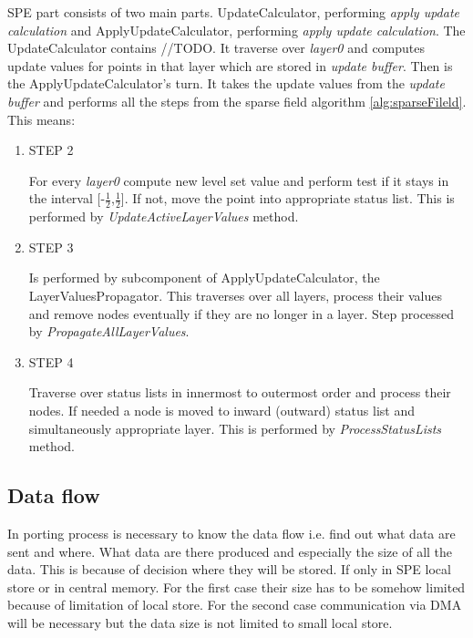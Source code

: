 SPE part consists of two main parts.
UpdateCalculator, performing \emph{apply update calculation} and ApplyUpdateCalculator, performing \emph{apply update calculation}.
The UpdateCalculator contains //TODO. It traverse over \emph{layer0} and computes update values for points in that layer which are stored in \emph{update buffer}.
Then is the ApplyUpdateCalculator's turn.
It takes the update values from the \emph{update buffer} and performs all the steps from the sparse field algorithm \ref{alg:sparseFileld}.
This means:
\begin{enumerate}
\item STEP 2
\par
For every \emph{layer0} compute new level set value and perform test if it stays in the interval [-$\frac{1}{2}$,$\frac{1}{2}$].
If not, move the point into appropriate status list.
This is performed by \emph{UpdateActiveLayerValues} method.

\item STEP 3
\par
Is performed by subcomponent of ApplyUpdateCalculator, the LayerValuesPropagator.
This traverses over all layers, process their values and remove nodes eventually if they are no longer in a layer.
Step processed by \emph{PropagateAllLayerValues}.

\item STEP 4
\par
Traverse over status lists in innermost to outermost order and process their
nodes. If needed a node is moved to inward (outward) status list and
simultaneously appropriate layer. This is performed by \emph{ProcessStatusLists}
method.
\end{enumerate}

\subsection{Data flow}

In porting process is necessary to know the data flow i.e. find out what data are sent and where.
What data are there produced and especially the size of all the data.
This is because of decision where they will be stored.
If only in SPE local store or in central memory.
For the first case their size has to be somehow limited because of limitation of local store.
For the second case communication via DMA will be necessary but the data size is not limited to small local store.

